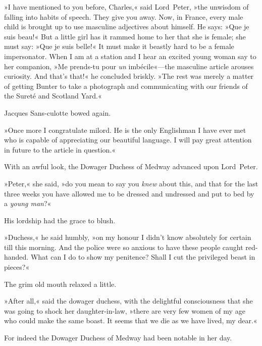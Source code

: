 »I have mentioned to you before, Charles,« said Lord~Peter, »the unwisdom of falling into habits of speech. They give you away. Now, in France, every male child is brought up to use masculine adjectives about himself. He says: »Que je suis beau!« But a little girl has it rammed home to her that she is female; she must say: »Que je suis belle!« It must make it beastly hard to be a female impersonator. When I am at a station and I hear an excited young woman say to her companion, »Me prends-tu pour \textit{un} imbécile«—the masculine article arouses curiosity. And that's that!« he concluded briskly. »The rest was merely a matter of getting Bunter to take a photograph and communicating with our friends of the Sureté and Scotland Yard.«

Jacques Sans-culotte bowed again.

»Once more I congratulate milord. He is the only Englishman I have ever met who is capable of appreciating our beautiful language. I will pay great attention in future to the article in question.«

With an awful look, the Dowager Duchess of Medway advanced upon Lord~Peter.

»Peter,« she said, »do you mean to say you \textit{knew} about this, and that for the last three weeks you have allowed me to be dressed and undressed and put to bed by a \textit{young man}?«

His lordship had the grace to blush.

»Duchess,« he said humbly, »on my honour I didn't know absolutely for certain till this morning. And the police were so anxious to have these people caught red-handed. What can I do to show my penitence? Shall I cut the privileged beast in pieces?«

The grim old mouth relaxed a little.

»After all,« said the dowager duchess, with the delightful consciousness that she was going to shock her daughter-in-law, »there are very few women of my age who could make the same boast. It seems that we die as we have lived, my dear.«

For indeed the Dowager Duchess of Medway had been notable in her day.